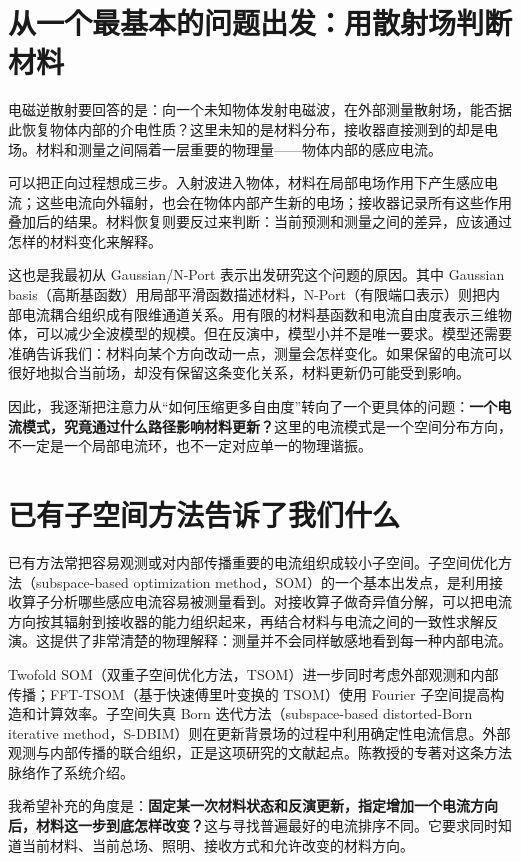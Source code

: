 \section{从一个最基本的问题出发：用散射场判断材料}
电磁逆散射要回答的是：向一个未知物体发射电磁波，在外部测量散射场，能否据此恢复物体内部的介电性质？这里未知的是材料分布，接收器直接测到的却是电场。材料和测量之间隔着一层重要的物理量——物体内部的感应电流。

可以把正向过程想成三步。入射波进入物体，材料在局部电场作用下产生感应电流；这些电流向外辐射，也会在物体内部产生新的电场；接收器记录所有这些作用叠加后的结果。材料恢复则要反过来判断：当前预测和测量之间的差异，应该通过怎样的材料变化来解释。

这也是我最初从 Gaussian/N-Port 表示出发研究这个问题的原因。其中 Gaussian basis（高斯基函数）用局部平滑函数描述材料，N-Port（有限端口表示）则把内部电流耦合组织成有限维通道关系。用有限的材料基函数和电流自由度表示三维物体，可以减少全波模型的规模。但在反演中，模型小并不是唯一要求。模型还需要准确告诉我们：材料向某个方向改动一点，测量会怎样变化。如果保留的电流可以很好地拟合当前场，却没有保留这条变化关系，材料更新仍可能受到影响。

因此，我逐渐把注意力从“如何压缩更多自由度”转向了一个更具体的问题：\textbf{一个电流模式，究竟通过什么路径影响材料更新？}这里的电流模式是一个空间分布方向，不一定是一个局部电流环，也不一定对应单一的物理谐振。

\section{已有子空间方法告诉了我们什么}
已有方法常把容易观测或对内部传播重要的电流组织成较小子空间。子空间优化方法（subspace-based optimization method，SOM）的一个基本出发点，是利用接收算子分析哪些感应电流容易被测量看到。对接收算子做奇异值分解，可以把电流方向按其辐射到接收器的能力组织起来，再结合材料与电流之间的一致性求解反演。这提供了非常清楚的物理解释：测量并不会同样敏感地看到每一种内部电流。

Twofold SOM（双重子空间优化方法，TSOM）进一步同时考虑外部观测和内部传播；FFT-TSOM（基于快速傅里叶变换的 TSOM）使用 Fourier 子空间提高构造和计算效率。子空间失真 Born 迭代方法（subspace-based distorted-Born iterative method，S-DBIM）则在更新背景场的过程中利用确定性电流信息。外部观测与内部传播的联合组织，正是这项研究的文献起点。陈教授的专著对这条方法脉络作了系统介绍。

我希望补充的角度是：\textbf{固定某一次材料状态和反演更新，指定增加一个电流方向后，材料这一步到底怎样改变？}这与寻找普遍最好的电流排序不同。它要求同时知道当前材料、当前总场、照明、接收方式和允许改变的材料方向。

